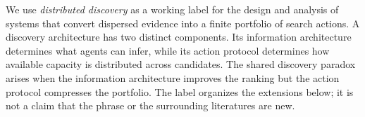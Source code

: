 We use \emph{distributed discovery} as a working label for the design and analysis of systems that convert dispersed evidence into a finite portfolio of search actions. A discovery architecture has two distinct components. Its information architecture determines what agents can infer, while its action protocol determines how available capacity is distributed across candidates. The shared discovery paradox arises when the information architecture improves the ranking but the action protocol compresses the portfolio. The label organizes the extensions below; it is not a claim that the phrase or the surrounding literatures are new.
